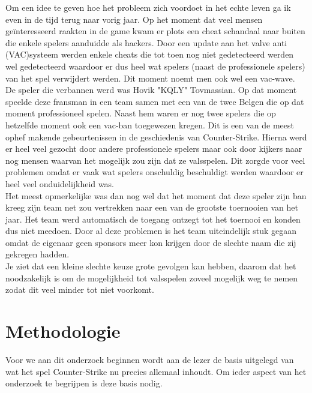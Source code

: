 \documentclass[pdftex,a4paper,12pt,twoside]{report}
\begin{document}
Om een idee te geven hoe het probleem zich voordoet in het echte leven ga ik even in de tijd terug naar vorig jaar. Op het moment dat veel mensen geïnteresseerd raakten in de game kwam er plots een \gls{cheat} schandaal naar buiten die enkele spelers aanduidde als hackers. Door een update aan het \gls{valve} \gls{anti} (VAC)systeem werden enkele \gls{cheat}s die tot toen nog niet gedetecteerd werden wel gedetecteerd waardoor er dus heel wat spelers (naast de professionele spelers) van het spel verwijdert werden. Dit moment noemt men ook wel een \gls{vac}-wave.
\\

De speler die verbannen werd was Hovik "KQLY"  Tovmassian. Op dat moment speelde deze fransman in een team samen met een van de twee Belgen die op dat moment professioneel spelen. Naast hem waren er nog twee spelers die op hetzelfde moment ook een \gls{vac}-ban toegewezen kregen. Dit is een van de meest ophef makende gebeurtenissen in de geschiedenis van Counter-Strike. Hierna werd er heel veel gezocht door andere professionele spelers maar ook door kijkers naar nog mensen waarvan het mogelijk zou zijn dat ze valsspelen. Dit zorgde voor veel problemen omdat er vaak wat spelers onschuldig beschuldigt werden waardoor er heel veel onduidelijkheid was.\citep{pcgamerhackingscandal}
\\

Het meest opmerkelijke was dan nog wel dat het moment dat deze speler zijn ban kreeg zijn team net zou vertrekken naar een van de grootste toernooien van het jaar. Het team werd automatisch de toegang ontzegt tot het toernooi en konden dus niet meedoen. Door al deze problemen is het team uiteindelijk stuk gegaan omdat de eigenaar geen sponsors meer kon krijgen door de slechte naam die zij gekregen hadden. \citep{titan}
\\

Je ziet dat een kleine slechte keuze grote gevolgen kan hebben, daarom dat het noodzakelijk is om de mogelijkheid tot valsspelen zoveel mogelijk weg te nemen zodat dit veel minder tot niet voorkomt.

\chapter{Methodologie}
\label{ch:methodologie}
Voor we aan dit onderzoek beginnen wordt aan de lezer de basis uitgelegd van wat het spel Counter-Strike nu precies allemaal inhoudt. Om ieder aspect van het onderzoek te begrijpen is deze basis nodig.
\\
\end{document}
